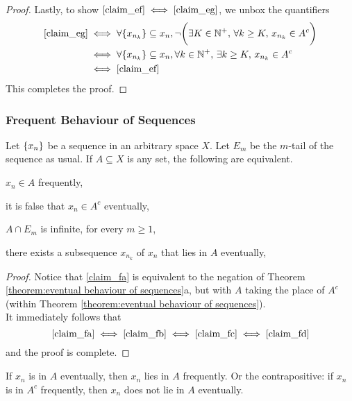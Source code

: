 \documentclass[../../main.tex]{subfiles}
\begin{document}
\begin{proof}
    Lastly, to show $\ref{claim_ef}\iff\ref{claim_eg}$, we unbox the quantifiers
    \begin{align*}
    \ref{claim_eg}&\iff \forall \{x_{n_k}\}\subseteq x_n, \neg\biggl(\exists K\in\mathbb{N}^+,\,\forall k\geq K,\, x_{n_k}\in A^c\biggr)\\
    &\iff \forall \{x_{n_k}\}\subseteq x_n,\forall k\in\mathbb{N}^+,\,\exists k\geq K,\, x_{n_k}\in A^c\\
    &\iff \ref{claim_ef}
    \end{align*}
    This completes the proof.
\end{proof}
\newpage
\subsubsection*{Frequent Behaviour of Sequences}
\begin{wts}\label{theorem:frequent behaviour of sequences}
    Let $\{x_n\}$ be a sequence in an arbitrary space $X$. Let $E_m$ be the $m$-tail of the sequence as usual. If $A\subseteq X$ is any set, the following are equivalent.
    \begin{enumalpha}
        \item $x_n\in A$ frequently,\label{claim_fa}
        \item it is false that $x_n\in A^c$ eventually,\label{claim_fb}
        \item $A\cap E_m$ is infinite, for every $m\geq 1$,\label{claim_fc}
        \item there exists a subsequence $x_{n_k}$ of $x_n$ that lies in $A$ eventually,\label{claim_fd}
    \end{enumalpha}
\end{wts}
\begin{proof}
    Notice that \ref{claim_fa} is equivalent to the negation of Theorem \ref{theorem:eventual behaviour of sequences}a, but with $A$ taking the place of $A^c$ (within Theorem \ref{theorem:eventual behaviour of sequences}). \\
    
    It immediately follows that
    \[
    \ref{claim_fa}\iff \ref{claim_fb}\iff \ref{claim_fc}\iff \ref{claim_fd}
    \]
    and the proof is complete.
\end{proof}
\begin{corollary}
    If $x_n$ is in $A$ eventually, then $x_n$ lies in $A$ frequently. Or the contrapositive: if $x_n$ is in $A^c$ frequently, then $x_n$ does not lie in $A$ eventually.
\end{corollary}
\end{document}
